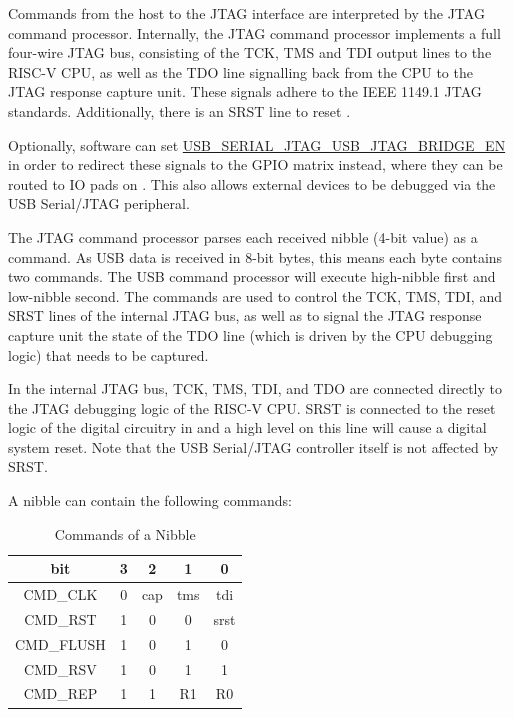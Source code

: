 \documentclass[main\_\_EN.tex]{subfiles}
\begin{document}
Commands from the host to the JTAG interface are interpreted by the JTAG command processor. Internally, the JTAG command processor implements a full four-wire JTAG bus, consisting of the TCK, TMS and TDI output lines to the RISC-V CPU, as well as the TDO line signalling back from the CPU to the JTAG response capture unit. These signals adhere to the IEEE 1149.1 JTAG standards. Additionally, there is an SRST line to reset \chipname{}.

Optionally, software can set \hyperref[fielddesc:USBSERIALJTAGUSBJTAGBRIDGEEN]{USB\_SERIAL\_JTAG\_USB\_JTAG\_BRIDGE\_EN} in order to redirect these signals to the GPIO matrix instead, where they can be routed to IO pads on \chipname{}. This also allows external devices to be debugged via the USB Serial/JTAG peripheral.

The JTAG command processor parses each received nibble (4-bit value) as a command. As USB data is received in 8-bit bytes, this means each byte contains two commands. The USB command processor will execute high-nibble first and low-nibble second. The commands are used to control the TCK, TMS, TDI, and SRST lines of the internal JTAG bus, as well as to signal the JTAG response capture unit the state of the TDO line (which is driven by the CPU debugging logic) that needs to be captured.

In the internal JTAG bus, TCK, TMS, TDI, and TDO are connected directly to the JTAG debugging logic of the RISC-V CPU. SRST is connected to the reset logic of the digital circuitry in \chipname{} and a high level on this line will cause a digital system reset. Note that the USB Serial/JTAG controller itself is not affected by SRST.

A nibble can contain the following commands:

\begin{table}[H]
    \centering
    \caption{Commands of a Nibble}
    \label{tab:usbserialjtag-commands-of-a-nibble}

    \begin{tabular}{|c|c c c c|}
    \hline
        \rowcolor{lightgray}
        \textbf{bit} & \textbf{3} & \textbf{2} & \textbf{1} & \textbf{0}
        \\\hline

        CMD\_CLK & 0 &  cap & tms & tdi \\\hline
        CMD\_RST & 1 & 0 & 0 & srst \\\hline
        CMD\_FLUSH & 1 & 0 & 1 & 0 \\\hline
        CMD\_RSV & 1 & 0 & 1 & 1 \\\hline
        CMD\_REP & 1 & 1 & R1 & R0 \\\hline
    \end{tabular}
\end{table}
\end{document}
